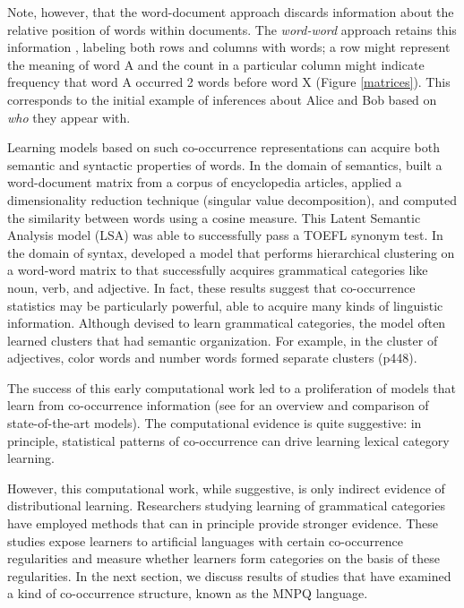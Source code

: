 \documentclass[man,floatsintext]{apa6}
\begin{document}
Note, however, that the word-document approach discards information about the relative position of words within documents. The \emph{word-word} approach retains this information \citep{church1990, schutze1992}, labeling both rows and columns with words; a row might represent the meaning of word A and the count in a particular column might indicate frequency that word A occurred 2 words before word X (Figure \ref{matrices}). This corresponds to the initial example of inferences about Alice and Bob based on \emph{who} they appear with.

Learning models based on such co-occurrence representations can acquire both semantic and syntactic properties of words. In the domain of semantics, \citet{landauer1997} built a word-document matrix from a corpus of encyclopedia articles, applied a dimensionality reduction technique (singular value decomposition), and computed the similarity between words using a cosine measure. This Latent Semantic Analysis model (LSA) was able to successfully pass a TOEFL synonym test. In the domain of syntax, \citet{redington1998} developed a model that performs hierarchical clustering on a word-word matrix to that successfully acquires grammatical categories like noun, verb, and adjective. In fact, these results suggest that co-occurrence statistics may be particularly powerful, able to acquire many kinds of linguistic information. Although devised to learn grammatical categories, the model often learned clusters that had semantic organization. For example, in the cluster of adjectives, color words and number words formed separate clusters (p448).

The success of this early computational work led to a proliferation of models that learn from co-occurrence information (see \citealp{riordan2010} for an overview and comparison of state-of-the-art models). The computational evidence is quite suggestive: in principle, statistical patterns of co-occurrence can drive learning lexical category learning.

However, this computational work, while suggestive, is only indirect evidence of distributional learning. Researchers studying learning of grammatical categories have employed methods that can in principle provide stronger evidence. These studies expose learners to artificial languages with certain co-occurrence regularities and measure whether learners form categories on the basis of these regularities. In the next section, we discuss results of studies that have examined a kind of co-occurrence structure, known as the MNPQ language.
\end{document}
